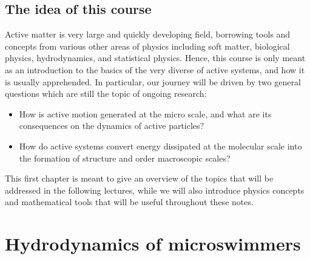 
\subsection*{The idea of this course}

Active matter is very large and quickly developing field, borrowing tools and concepts from various other areas of physics including soft matter, biological physics, hydrodynamics, and statistical physics. Hence, this course is only meant as an introduction to the basics of the very diverse of active systems, and how it is usually apprehended. In particular, our journey will be driven by two general questions which are still the topic of ongoing research:
\begin{itemize}
    \item How is active motion generated at the micro scale, and what are its consequences on the dynamics of active particles?
    \item How do active systems convert energy dissipated at the molecular scale into the formation of structure and order macroscopic scales?
\end{itemize}
This first chapter is meant to give an overview of the topics that will be addressed in the following lectures, while we will also introduce physics concepts and mathematical tools that will be useful throughout these notes.


\section{Hydrodynamics of microswimmers}
\label{sec: hydrodynamics of microswimmers}

